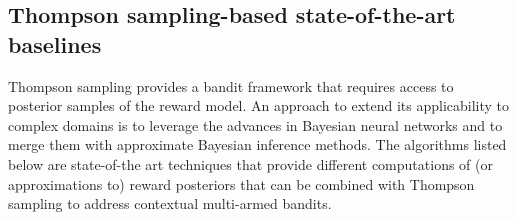 \subsection{Thompson sampling-based state-of-the-art baselines}
\label{ssec:ts_baselines}

Thompson sampling provides a bandit framework that requires access to posterior samples of the reward model.
An approach to extend its applicability to complex domains is to leverage the advances in Bayesian neural networks and to merge them with approximate Bayesian inference methods. The algorithms listed below are state-of-the art techniques that provide different computations of (or approximations to) reward posteriors that can be combined with Thompson sampling to address contextual multi-armed bandits.

